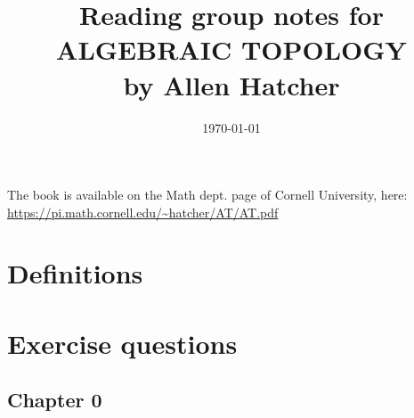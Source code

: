 \documentclass[a4paper,10pt]{article}
\title{Reading group notes for\\ ALGEBRAIC TOPOLOGY\\ by Allen Hatcher}
\date{\today}
\begin{document}
\maketitle

The book is available on the Math dept. page of Cornell University, here:\\

\url{https://pi.math.cornell.edu/~hatcher/AT/AT.pdf}

\newpage
\section*{Definitions}


\newpage
\section*{Exercise questions}
\subsection*{Chapter 0}

\end{document}
